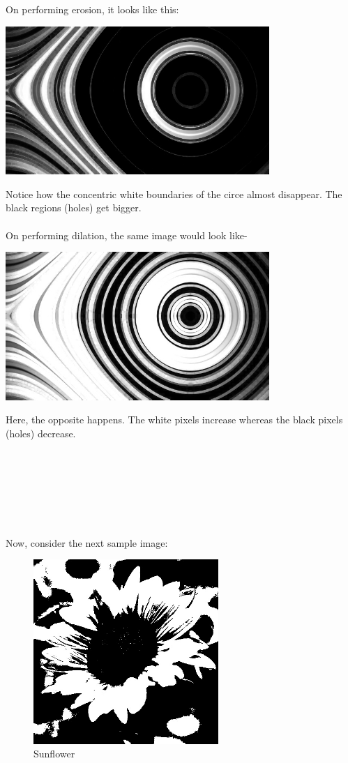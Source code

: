 \documentclass[]{article}
\begin{document}
On performing erosion, it looks like this:\\
\begin{center}
\includegraphics[width = 10cm]{images/Morphological Operations/Images/Eroded.jpg}
\end{center}
Notice how the concentric white boundaries of the circe almost
disappear. The black regions (holes) get bigger.
\\ \\
On performing dilation, the same image would look like-
\begin{center}
\includegraphics[width = 10cm]{images/Morphological Operations/Images/Dilated.jpg}
\end{center}
Here, the opposite happens. The white pixels increase whereas the black
pixels (holes) decrease. \\ \\ \\ \\ \\ \\ \\ \\
Now, consider the next sample image:

\begin{figure}[htbp]
\begin{center}
\includegraphics[width = 7cm]{images/Morphological Operations/Images/Sunflower.jpg}
\caption{Sunflower}
\end{center}
\end{figure}
\end{document}
